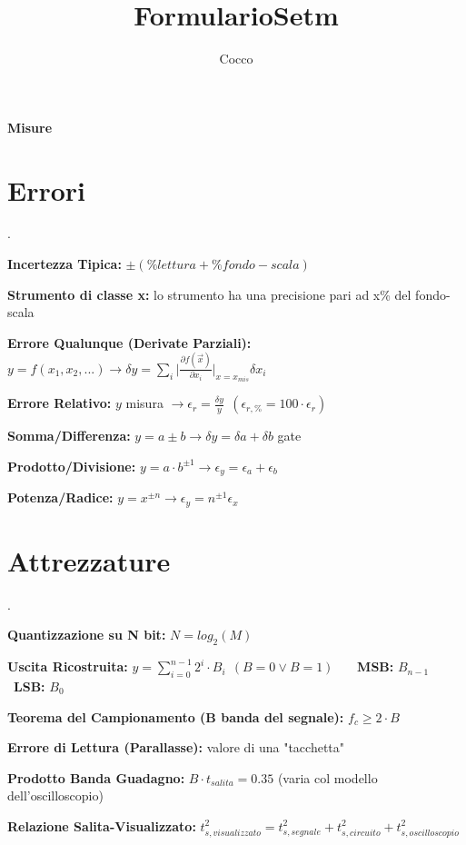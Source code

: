 \documentclass[12pt]{extarticle}
\title{FormularioSetm}
\author{{Cocco}}
\date{}
\begin{document}
\thispagestyle{empty}
{\bf \huge Misure}
\section{Errori}.


{\bf Incertezza Tipica:} $\pm (\% lettura + \% fondo-scala) $

{\bf Strumento di classe x:} lo strumento ha una precisione pari ad x\% del fondo-scala


{\bf Errore Qualunque (Derivate Parziali):} $\displaystyle y = f(x_1, x_2, ...) \to \delta y  = \sum_i \Bigg |\frac{\partial f(\vec{x})}{\partial x_i}\Bigg |_{x=x_{mis}} \delta x_i $

{\bf Errore Relativo:} $y$ misura $\displaystyle\to \epsilon_r = \frac{\delta y}{y} \ \ (\epsilon_{r, \%} = 100\cdot\epsilon_r)$

{\bf Somma/Differenza:} $y = a \pm b \to \delta y = \delta a + \delta b$ gate


{\bf Prodotto/Divisione:} $\displaystyle y = a\cdot b^{\pm 1} \to \epsilon_y = \epsilon_a + \epsilon_b$

{\bf Potenza/Radice:} $\displaystyle y = x^{\pm n} \to \epsilon_y = n^{\pm 1}\epsilon_x$

\section{Attrezzature}. 


{\bf Quantizzazione su N bit:} $ N = log_2(M) $

{\bf Uscita Ricostruita:} $\displaystyle y = \sum_{i=0}^{n-1} 2^i\cdot B_i \ \ (B = 0 \lor B = 1)$ \ \ \ {\bf MSB:} $ B_{n-1} $ \ {\bf LSB:} $ B_0 $ 

{\bf Teorema del Campionamento (B banda del segnale):} $ f_c \ge 2\cdot B $

{\bf Errore di Lettura (Parallasse):} valore di una "tacchetta"

{\bf Prodotto Banda Guadagno:} $ B\cdot t_{salita} = 0.35 $ (varia col modello dell'oscilloscopio)

{\bf Relazione Salita-Visualizzato:} $\displaystyle t_{s, visualizzato}^2 = t_{s, segnale}^2 + t_{s, circuito}^2 + t_{s, oscilloscopio}^2$
\end{document}
